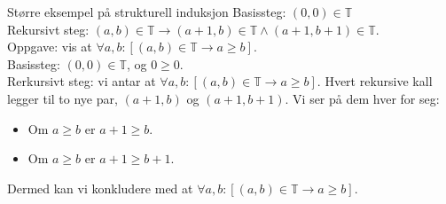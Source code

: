 \begin{frame}{Større eksempel på strukturell induksjon}
    Basissteg: $(0, 0) \in \mathbb{T}$\\
    Rekursivt steg: $(a, b) \in \mathbb{T} \rightarrow (a+1, b) \in \mathbb{T} \land (a+1, b+1) \in \mathbb{T}$.\\
    
    Oppgave: vis at $\forall a, b : [(a, b) \in \mathbb{T} \rightarrow a \geq b]$.\\
    
    \pause
    Basissteg: $(0, 0) \in \mathbb{T}$, og $0 \geq 0$. \checkmark\\
    Rerkursivt steg: vi antar at $\forall a, b : [(a, b) \in \mathbb{T} \rightarrow a \geq b]$. Hvert rekursive kall legger til to nye par, $(a+1, b)$ og $(a+1, b+1)$. Vi ser på dem hver for seg:
    \begin{itemize}
        \item Om $a \geq b$ er $a+1 \geq b$.
        \item Om $a \geq b$ er $a+1 \geq b+1$. \checkmark
    \end{itemize}
    Dermed kan vi konkludere med at $\forall a, b : [(a, b) \in \mathbb{T} \rightarrow a \geq b]$.
\end{frame}
